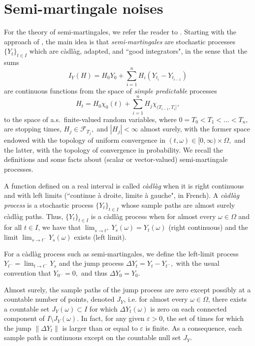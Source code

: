 \documentclass[reqno,12pt]{amsart}
\theoremstyle{plain} %
\theoremstyle{definition} %
\begin{document}
\section{Semi-martingale noises}
\label{secsemimartingale}

For the theory of semi-martingales, we refer the reader to \cite{AitSahaliaJacod2014,HeWangYan1992,KaratzasShreve2014,Metivier1982,Protter2005}. Starting with the approach of \cite{Protter2005}, the main idea is that \emph{semi-martingales} are stochastic processes {$\{Y_t\}_{t\in I}$} which are c\`adl\`ag, adapted, and ``good integrators", in the sense that the sums
\[
    I_Y(H) = H_0 Y_0 + \sum_{i=1}^n H_i(Y_{t_i}-Y_{t_{i-1}})
\]
are continuous functions from the space of \emph{simple predictable} processes
\[
    H_t = H_0 \chi_{0}(t) + \sum_{i=1}^n H_j \chi_{(T_{i-1}, T_i]},
\]
to the space of a.s.~finite-valued random variables, where $0=T_0 < T_1 < \ldots < T_n,$ are stopping times, $H_j \in \mathcal{F}_{T_j},$ and $|H_j| < \infty$ almost surely, with the former space endowed with the topology of uniform convergence in $(t, \omega)\in [0,\infty)\times \Omega,$ and the latter, with the topology of convergence in probability. We recall the definitions and some facts about (scalar or vector-valued) semi-martingale processes.

A function defined on a real interval is called \emph{c\`adl\`ag} when it is right continuous and with left limits (``continue \`a droite, limite \`a gauche", in French). A \emph{c\`adl\`ag process} is a stochastic process $\{Y_t\}_{t\in I}$ whose sample paths are almost surely c\`adl\`ag paths. Thus, $\{Y_t\}_{t\in I}$ is a c\`adl\`ag process when for almost every $\omega\in \Omega$ and for all $t\in I$, we have that $\lim_{s\rightarrow t^+} Y_s(\omega) = Y_t(\omega)$ (right continuous) and the limit $\lim_{s \rightarrow t^-} Y_s(\omega)$ exists (left limit).

For a c\`adl\`ag process such as semi-martingales, we define the left-limit process $Y_{t^{-}} = \lim_{t \rightarrow t^-} Y_s$ and the jump process $\Delta Y_t = Y_t - Y_{t^{-}},$ with the usual convention that $Y_{0^-} = 0,$ and thus $\Delta Y_0 = Y_0.$

Almost surely, the sample paths of the jump process are zero except possibly at a countable number of points, denoted $J_{Y}$, i.e. for almost every $\omega\in \Omega$, there exists a countable set $J_{Y}(\omega) \subset I$ for which $\Delta Y_t(\omega)$ is zero on each connected component of $I\setminus J_{Y}(\omega)$. In fact, for any given $\varepsilon > 0$, the set of times for which the jump $\|\Delta Y_t\|$ is larger than or equal to $\varepsilon$ is finite. As a consequence, each sample path is continuous except on the countable null set $J_{Y}.$
\end{document}

